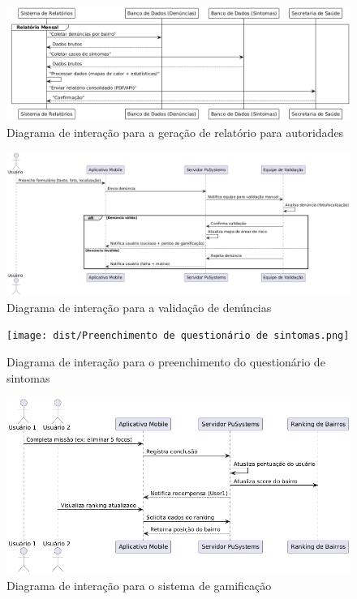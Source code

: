\documentclass[a4paper, 12pt]{article}
\begin{document}
\begin{figure}[H]
    \centering
    \includegraphics[width=1\textwidth]{dist/Geração de relatório para autoridades.png}
    \caption{Diagrama de interação para a geração de relatório para autoridades}
    \label{fig:arquitetura}
\end{figure}

\begin{figure}[H]
    \centering
    \includegraphics[width=1\textwidth]{dist/Validação de denúncia.png}
    \caption{Diagrama de interação para a validação de denúncias}
    \label{fig:arquitetura}
\end{figure}

\begin{figure}[H]
    \centering
    \texttt{[image: dist/Preenchimento de questionário de sintomas.png]}
    \caption{Diagrama de interação para o preenchimento do questionário de sintomas}
    \label{fig:arquitetura}
\end{figure}

\begin{figure}[H]
    \centering
    \includegraphics[width=1\textwidth]{dist/Sistema de gamificação.png}
    \caption{Diagrama de interação para o sistema de gamificação}
    \label{fig:arquitetura}
\end{figure}
\end{document}
